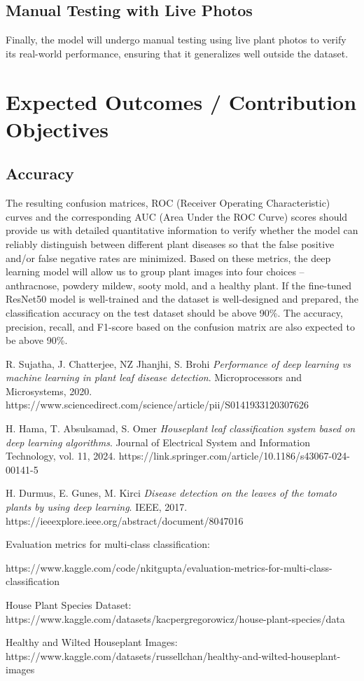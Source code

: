 \documentclass[12pt]{article}
\begin{document}
\subsection{Manual Testing with Live Photos}
Finally, the model will undergo manual testing using live plant photos to verify its real-world performance, ensuring that it generalizes well outside the dataset.



\section{Expected Outcomes / Contribution Objectives}
\subsection{Accuracy}
The resulting confusion matrices, ROC (Receiver Operating Characteristic) curves and the corresponding AUC (Area Under the ROC Curve) scores should provide us with detailed quantitative information to verify whether the model can reliably distinguish between different plant diseases so that the false positive and/or false negative rates are minimized. Based on these metrics, the deep learning model will allow us to group plant images into four choices – anthracnose, powdery mildew, sooty mold, and a healthy plant. If the fine-tuned ResNet50 model is well-trained and the dataset is well-designed and prepared, the classification accuracy on the test dataset should be above 90\%. The accuracy, precision, recall, and F1-score based on the confusion matrix are also expected to be above 90\%.





\begin{thebibliography}{9}

R. Sujatha, J. Chatterjee, NZ Jhanjhi, S. Brohi 
\textit{Performance of deep learning vs machine learning in plant leaf
disease detection}. 
Microprocessors and Microsystems, 2020. https://www.sciencedirect.com/science/article/pii/S0141933120307626

H. Hama, T. Absulsamad, S. Omer
\textit{Houseplant leaf classification system based on deep learning algorithms}. 
Journal of Electrical System and Information Technology, vol. 11, 2024. https://link.springer.com/article/10.1186/s43067-024-00141-5

H. Durmus, E. Gunes, M. Kirci
\textit{Disease detection on the leaves of the tomato plants by using deep learning}. 
IEEE, 2017. https://ieeexplore.ieee.org/abstract/document/8047016

Evaluation metrics for multi-class classification: 

https://www.kaggle.com/code/nkitgupta/evaluation-metrics-for-multi-class-classification


House Plant Species Dataset:
https://www.kaggle.com/datasets/kacpergregorowicz/house-plant-species/data

Healthy and Wilted Houseplant Images: https://www.kaggle.com/datasets/russellchan/healthy-and-wilted-houseplant-images

\end{thebibliography}
\end{document}
